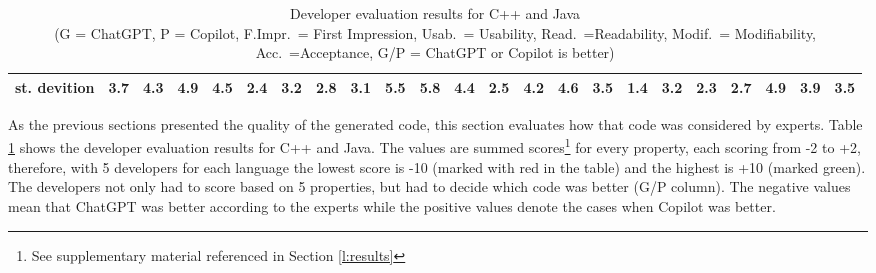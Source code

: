 \begin{table}[!h]
{\begin{tabular}{|p{2.9cm}|rr|rr|rr|rr|rr|r||rr|rr|rr|rr|rr|r|}
			st. devition            & 3.7                                  & {4.3}                                  & 4.9                                  & {4.5}                                  & 2.4                                  & {3.2}                                  & 2.8                                  & {3.1}                                  & 5.5                                  & {5.8}                                  & 4.4                                   & 2.5                                  & {4.2}                                  & 4.6                                  & {3.5}                                  & 1.4                                  & {3.2}                                  & 2.3                                  & {2.7}                                  & 4.9                                  & {3.9}                                  & 3.5                                   \\ \hline
		\end{tabular}
	}
	\vspace{2px}
	\caption{Developer evaluation results for C++ and Java\\ (G = ChatGPT, P = Copilot, F.Impr.~= First Impression, Usab.~= Usability, Read.~=Readability, Modif.~= Modifiability, Acc.~=Acceptance, G/P = ChatGPT or Copilot is better)}
	\label{t:reviews}
	\vspace{-25px}
\end{table}

As the previous sections presented the quality of the generated code, this section evaluates how that code was considered by experts.
Table \ref{t:reviews} shows the developer evaluation results for C++ and Java.
The values are summed scores\footnote{See supplementary material referenced in Section \ref{l:results}} for every property, each scoring from -2 to +2, therefore, with 5 developers for each language the lowest score is -10 (marked with red in the table) and the highest is +10 (marked green).
The developers not only had to score based on 5 properties, but had to decide which code was better (G/P column).
The negative values mean that ChatGPT was better according to the experts while the positive values denote the cases when Copilot was better.

